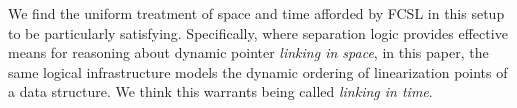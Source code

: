 We find the uniform treatment of space and time afforded by FCSL in
this setup to be particularly satisfying. Specifically, where
separation logic provides effective means for reasoning about dynamic
pointer \emph{linking in space}, in this paper, the same logical
infrastructure models the dynamic ordering of linearization points of
a data structure. We think this warrants being called \emph{linking in
  time}.

%
\begin{comment}
In particular, we circumvent linearizability, in favor of Hoare-style
specifications in a variant of concurrent separation logic,
FCSL~\cite{LeyWild-Nanevski:POPL13,Nanevski-al:ESOP14}. We will rely
on two key features of FCSL to solve the problems. First, FCSL's
notion of auxiliary state will allow us to track the temporal
positioning of operations (an equivalent of linearization points in
linearizability reasoning) in a \emph{local} way. We do so by
utilizing FCSL abstractions that specify not only what the \emph{self}
thread (i.e., the thread being specified) does, but also what all the
\emph{other} threads in the system do collectively.

Second, FCSL abstracts over the specifics of how the state, real or
auxiliary, of the data structure is implemented. Any structure is
admissible, as long as it satisfies the algebraic axioms of a
\emph{Partial Commutative Monoid} (PCM). Heaps with the operation of
disjoint union are a particular PCM, taken as the default notion of
state in separation logic. But, we can take other PCMs, such as that
of \emph{histories} to keep track of the position of linearization
points. 

Thus, where separation logic provides effective means for
reasoning about pointer linking (and re-linking) in \emph{space}, in
FCSL, exactly the same logical infrastructure will provide us with
equally effective means for reasoning about linking (and re-linking)
in \emph{time}, which is precisely what the ordering (and re-ordering)
of linearization points of a data structure represents.
\end{comment}

